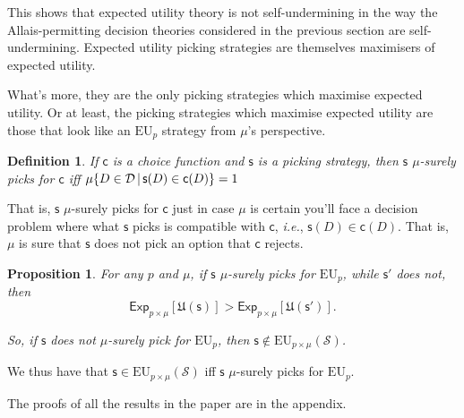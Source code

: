 \documentclass[a4paper]{article}
\newtheorem{definition}{Definition}
\newtheorem{proposition}[theorem]{Proposition}
\newcommand\Exp{\mathsf{Exp}}
\newcommand\EU{\mathrm{EU}}
\newcommand\U{\mathfrak{U}} %
\newcommand{\D}{\mathcal{D}}
\renewcommand\S{\mathcal{S}}
\newcommand\s{\mathsf{s}}
\renewcommand\c{\mathsf{c}} %
\newcommand{\Strategies}{\S}
\newcommand\SetDelimiter[1][]{
	\nonscript\,#1\vert \allowbreak \nonscript\,\mathopen{}}
\providecommand\given{\SetDelimiter}
\newenvironment{CCM rewritten}
{\begingroup\color{blue}} %
{\endgroup}              %
\begin{document}
This shows that expected utility theory is not self-undermining in the way the Allais-permitting decision theories considered in the previous section are self-undermining. Expected utility picking strategies are themselves maximisers of expected utility. 

What's more, they are the only picking strategies which maximise expected utility. Or at least, the picking strategies which maximise expected utility are those that look like an $\EU_p$ strategy from $\mu$'s perspective. %

\begin{definition}\label{def:mu surely picks for}
If $\c$ is a choice function and $\s$ is a picking strategy, then $\s$ \emph{$\mu$-surely picks for $\c$} iff $\mu\{D \in \D \given \s(D)\in \c(D)\}=1$
\end{definition}
{That is, $\s$ $\mu$-surely picks for $\c$ just in case $\mu$ is certain you'll face a decision problem where what $\s$ picks is compatible with $\c$, \emph{i.e.}, $\s(D)\in\c(D)$. That is, $\mu$ is sure that $\s$ does not pick an option that $\c$ rejects. }

\begin{proposition}\label{thm:eu-uniquely-optimal}
	For any $p$ and $\mu$, if $\s$ $\mu$-surely picks for $\EU_p$, while $\s'$ does not, then $$\Exp_{p\times\mu}[\U(\s)] > \Exp_{p\times\mu}[\U(\s')].$$
	
	So, if $\s$ does not $\mu$-surely pick for $\EU_p$, then $\s\notin\EU_{p\times\mu}(\Strategies)$. 
\end{proposition}

We thus have that $\s \in \EU_{p\times \mu}(\Strategies)$ iff $\s$ $\mu$-surely picks for $\EU_p$.

The proofs of all the results in the paper are in the appendix.
\end{document}
